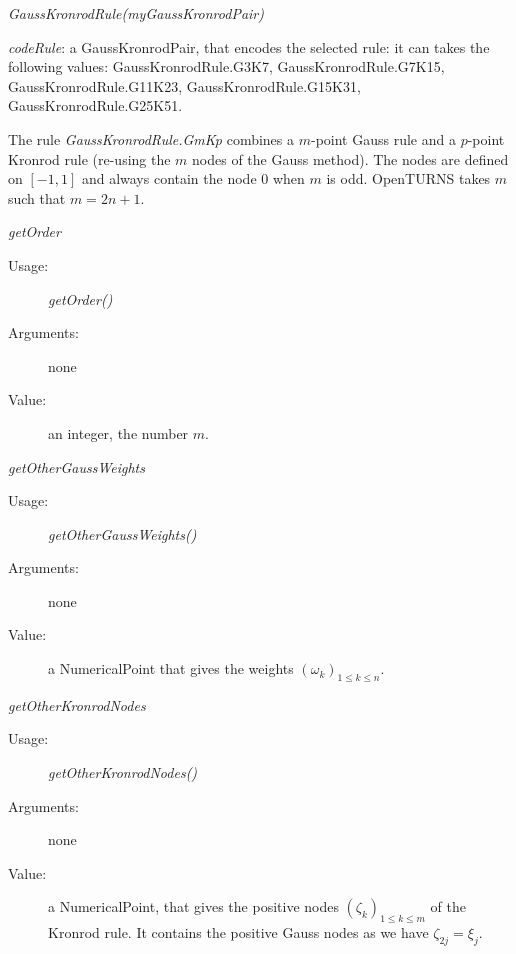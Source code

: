 \begin{description}
\item[Usage:] \rule{0pt}{1em}
  \begin{description}
  \item \textit{GaussKronrodRule(myGaussKronrodPair)}
  \end{description}

\item[Arguments:] \rule{0pt}{1em}
  \begin{description}
  \item \textit{codeRule}: a GaussKronrodPair, that encodes the selected rule: it can takes the following values: GaussKronrodRule.G3K7, GaussKronrodRule.G7K15, GaussKronrodRule.G11K23, GaussKronrodRule.G15K31, GaussKronrodRule.G25K51.
  \end{description}

\item[Details:] The rule {\itshape GaussKronrodRule.GmKp} combines a $m$-point Gauss rule and a $p$-point Kronrod rule (re-using the $m$ nodes of the Gauss method). The nodes are defined on $[-1, 1]$ and always contain the node 0 when $m$ is odd. OpenTURNS takes $m$ such that $m=2n+1$.\\

\item[Some methods:]  \rule{0pt}{1em}


  \begin{description}


  \item \textit{getOrder}
    \begin{description}
    \item[Usage:] \textit{getOrder()}
    \item[Arguments:] none
    \item[Value:]  an integer, the number $m$.
    \end{description}
    \bigskip


  \item \textit{getOtherGaussWeights}
    \begin{description}
    \item[Usage:] \textit{getOtherGaussWeights()}
    \item[Arguments:] none
    \item[Value:]  a NumericalPoint that gives the weights $(\omega_k)_{1 \leq k \leq n}$.
    \end{description}
    \bigskip

  \item \textit{getOtherKronrodNodes}
    \begin{description}
    \item[Usage:] \textit{getOtherKronrodNodes()}
    \item[Arguments:] none
    \item[Value:]  a NumericalPoint, that gives the positive nodes $(\zeta_k)_{1 \leq k \leq m}$ of the Kronrod rule. It contains the positive Gauss nodes as we have $\zeta_{2j}=\xi_j$.
    \end{description}
    \bigskip


\end{description}
\end{description}
